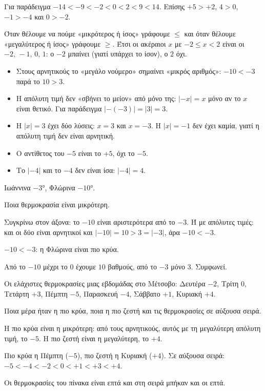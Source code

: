 Για παράδειγμα $-14<-9<-2<0<2<9<14$. Επίσης $+5>+2$, $4>0$, $-1>-4$ και $0>-2$.

Όταν θέλουμε να πούμε «μικρότερος ή ίσος» γράφουμε $\le$ και όταν θέλουμε «μεγαλύτερος ή ίσος» γράφουμε $\ge$. Έτσι οι ακέραιοι $x$ με $-2\le x<2$ είναι οι $-2,\,-1,\,0,\,1$: ο $-2$ μπαίνει (γιατί υπάρχει το ίσον), ο $2$ όχι.

\begin{prosoxi}
\begin{itemize}[leftmargin=1.2em,itemsep=0.3ex,topsep=2pt]
\item Στους αρνητικούς το «μεγάλο νούμερο» σημαίνει «μικρός αριθμός»: $-10<-3$ παρά το $10>3$.
\item Η απόλυτη τιμή δεν «σβήνει το μείον» από μόνο της: $|-x|=x$ μόνο αν το $x$ είναι θετικό. Για παράδειγμα $|-(-3)|=|3|=3$.
\item Η $|x|=3$ έχει δύο λύσεις: $x=3$ και $x=-3$. Η $|x|=-1$ δεν έχει καμία, γιατί η απόλυτη τιμή δεν είναι αρνητική.
\item Ο αντίθετος του $-5$ είναι το $+5$, όχι το $-5$.
\item Το $|-4|$ και το $-4$ δεν είναι ίσα: $|-4|=4$.
\end{itemize}
\end{prosoxi}


\tixero Ιωάννινα $-3$°, Φλώρινα $-10$°.\par
\tithelo Ποια θερμοκρασία είναι μικρότερη.\par
\possindeo Συγκρίνω στον άξονα: το $-10$ είναι αριστερότερα από το $-3$. Ή με απόλυτες τιμές: και οι δύο είναι αρνητικοί και $|-10|=10>3=|-3|$, άρα $-10<-3$.\par
\apantisi $-10<-3$: η Φλώρινα είναι πιο κρύα.\par
\elegxos Από το $-10$ μέχρι το $0$ έχουμε $10$ βαθμούς, από το $-3$ μόνο $3$. Συμφωνεί.

\tixero Οι ελάχιστες θερμοκρασίες μιας εβδομάδας στο Μέτσοβο: Δευτέρα $-2$, Τρίτη $0$, Τετάρτη $+3$, Πέμπτη $-5$, Παρασκευή $-4$, Σάββατο $+1$, Κυριακή $+4$.\par
\tithelo Ποια μέρα ήταν η πιο κρύα, ποια η πιο ζεστή και τις θερμοκρασίες σε αύξουσα σειρά.\par
\possindeo Η πιο κρύα είναι η μικρότερη: από τους αρνητικούς, αυτός με τη μεγαλύτερη απόλυτη τιμή, το $-5$. Η πιο ζεστή είναι η μεγαλύτερη, το $+4$.\par
\apantisi Πιο κρύα η Πέμπτη ($-5$), πιο ζεστή η Κυριακή ($+4$). Σε αύξουσα σειρά: $-5<-4<-2<0<+1<+3<+4$.\par
\elegxos Οι θερμοκρασίες του πίνακα είναι επτά και στη σειρά μπήκαν και οι επτά.

